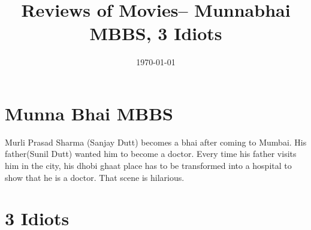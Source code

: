 \documentclass{article}
\title{Reviews of Movies-- Munnabhai MBBS, 3 Idiots}
\date{\today}
\begin{document}
\maketitle

\section{Munna Bhai MBBS}


Murli Prasad Sharma (Sanjay Dutt) becomes a bhai after coming to Mumbai. His father(Sunil Dutt) wanted him to become a doctor. Every time his father visits him in the city, his dhobi ghaat place has to be transformed into a hospital to show that he is a doctor. That scene is hilarious.




\section{3 Idiots}
\end{document}
